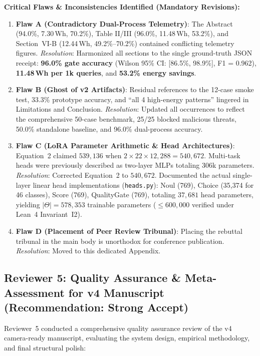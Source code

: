 \documentclass[conference]{IEEEtran}
\begin{document}
\noindent\textbf{Critical Flaws \& Inconsistencies Identified (Mandatory Revisions):}
\begin{enumerate}
  \item \textbf{Flaw A (Contradictory Dual-Process Telemetry)}: The Abstract (94.0\%, 7.30\,Wh, 70.2\%), Table II/III (96.0\%, 11.48\,Wh, 53.2\%), and Section~VI-B (12.44\,Wh, 49.2\%--70.2\%) contained conflicting telemetry figures. \emph{Resolution}: Harmonized all sections to the single ground-truth JSON receipt: \textbf{96.0\% gate accuracy} (Wilson 95\% CI: [86.5\%, 98.9\%], F1 = 0.962), \textbf{11.48\,Wh per 1k queries}, and \textbf{53.2\% energy savings}.
  \item \textbf{Flaw B (Ghost of v2 Artifacts)}: Residual references to the 12-case smoke test, 33.3\% prototype accuracy, and ``all 4 high-energy patterns'' lingered in Limitations and Conclusion. \emph{Resolution}: Updated all occurrences to reflect the comprehensive 50-case benchmark, 25/25 blocked malicious threats, 50.0\% standalone baseline, and 96.0\% dual-process accuracy.
  \item \textbf{Flaw C (LoRA Parameter Arithmetic \& Head Architectures)}: Equation~2 claimed $539{,}136$ when $2 \times 22 \times 12{,}288 = 540{,}672$. Multi-task heads were previously described as two-layer MLPs totaling 306k parameters. \emph{Resolution}: Corrected Equation~2 to $540{,}672$. Documented the actual single-layer linear head implementations (\texttt{heads.py}): Noul (769), Choice (35,374 for 46 classes), Score (769), QualityGate (769), totaling $37{,}681$ head parameters, yielding $|\Theta| = 578{,}353$ trainable parameters ($\leq 600{,}000$ verified under Lean~4 Invariant~I2).
  \item \textbf{Flaw D (Placement of Peer Review Tribunal)}: Placing the rebuttal tribunal in the main body is unorthodox for conference publication. \emph{Resolution}: Moved to this dedicated Appendix.
\end{enumerate}

\subsection{Reviewer 5: Quality Assurance \& Meta-Assessment for v4 Manuscript (Recommendation: Strong Accept)}
\label{subsec:rev5}

Reviewer~5 conducted a comprehensive quality assurance review of the v4 camera-ready manuscript, evaluating the system design, empirical methodology, and final structural polish:
\end{document}
